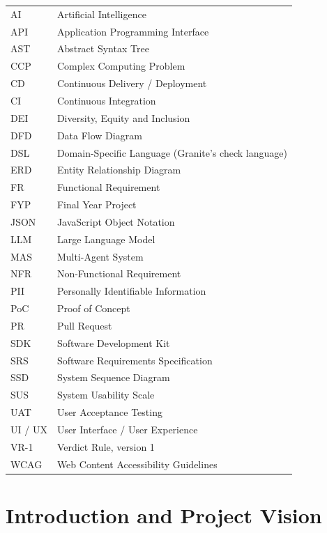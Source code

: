 \documentclass{fast-nuces-bs}
\begin{document}
\begin{tabular}{ll}
AI & Artificial Intelligence\\
API & Application Programming Interface\\
AST & Abstract Syntax Tree\\
CCP & Complex Computing Problem\\
CD & Continuous Delivery / Deployment\\
CI & Continuous Integration\\
DEI & Diversity, Equity and Inclusion\\
DFD & Data Flow Diagram\\
DSL & Domain-Specific Language (Granite's check language)\\
ERD & Entity Relationship Diagram\\
FR & Functional Requirement\\
FYP & Final Year Project\\
JSON & JavaScript Object Notation\\
LLM & Large Language Model\\
MAS & Multi-Agent System\\
NFR & Non-Functional Requirement\\
PII & Personally Identifiable Information\\
PoC & Proof of Concept\\
PR & Pull Request\\
SDK & Software Development Kit\\
SRS & Software Requirements Specification\\
SSD & System Sequence Diagram\\
SUS & System Usability Scale\\
UAT & User Acceptance Testing\\
UI / UX & User Interface / User Experience\\
VR-1 & Verdict Rule, version 1\\
WCAG & Web Content Accessibility Guidelines\\
\end{tabular}


\cleardoublepage
{}
\chapter{Introduction and Project Vision}
\end{document}
